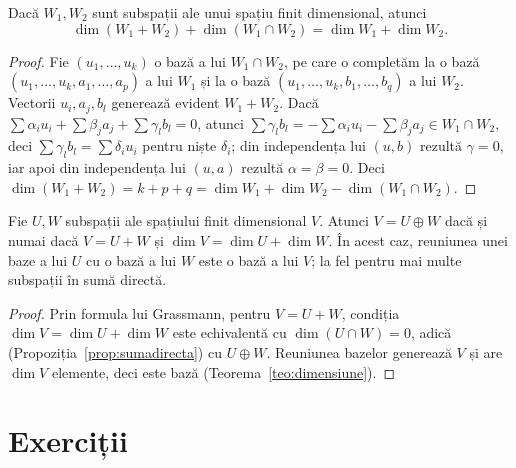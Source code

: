 \begin{teorema}\label{teo:grassmann}
Dacă $W_1,W_2$ sunt subspații ale unui spațiu finit dimensional, atunci
\[
\dim(W_1+W_2)+\dim(W_1\cap W_2)=\dim W_1+\dim W_2 .
\]
\end{teorema}

\begin{proof}
Fie $(u_1,\dots,u_k)$ o bază a lui $W_1\cap W_2$, pe care o completăm la o bază $(u_1,\dots,u_k,a_1,\dots,a_p)$ a lui $W_1$ și la o bază $(u_1,\dots,u_k,b_1,\dots,b_q)$ a lui $W_2$. Vectorii $u_i,a_j,b_l$ generează evident $W_1+W_2$. Dacă $\sum\alpha_iu_i+\sum\beta_ja_j+\sum\gamma_lb_l=0$, atunci $\sum\gamma_lb_l=-\sum\alpha_iu_i-\sum\beta_ja_j\in W_1\cap W_2$, deci $\sum\gamma_lb_l=\sum\delta_iu_i$ pentru niște $\delta_i$; din independența lui $(u,b)$ rezultă $\gamma=0$, iar apoi din independența lui $(u,a)$ rezultă $\alpha=\beta=0$. Deci $\dim(W_1+W_2)=k+p+q=\dim W_1+\dim W_2-\dim(W_1\cap W_2)$.
\end{proof}

\begin{corolar}\label{cor:sumadirectadim}
Fie $U,W$ subspații ale spațiului finit dimensional $V$. Atunci $V=U\oplus W$ dacă și numai dacă $V=U+W$ și $\dim V=\dim U+\dim W$. În acest caz, reuniunea unei baze a lui $U$ cu o bază a lui $W$ este o bază a lui $V$; la fel pentru mai multe subspații în sumă directă.
\end{corolar}

\begin{proof}
Prin formula lui Grassmann, pentru $V=U+W$, condiția $\dim V=\dim U+\dim W$ este echivalentă cu $\dim(U\cap W)=0$, adică (Propoziția~\ref{prop:sumadirecta}) cu $U\oplus W$. Reuniunea bazelor generează $V$ și are $\dim V$ elemente, deci este bază (Teorema~\ref{teo:dimensiune}).
\end{proof}

\section{Exerciții}

